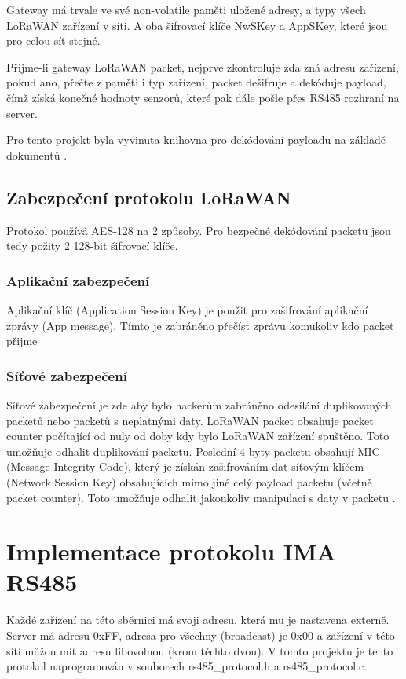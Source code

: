 Gateway má trvale ve své non-volatile paměti uložené adresy, a typy všech LoRaWAN zařízení v síti. A oba šifrovací klíče NwSKey a AppSKey, které jsou pro celou síť stejné.

Přijme-li gateway LoRaWAN packet, nejprve zkontroluje zda zná adresu zařízení, pokud ano, přečte z paměti i typ zařízení, packet dešifruje a dekóduje payload, čímž získá konečné hodnoty senzorů, které pak dále pošle přes RS485 rozhraní na server.

Pro tento projekt byla vyvinuta knihovna pro dekódování payloadu na základě dokumentů \cite{lwSpec} \cite{lwSecur}.

\subsection{Zabezpečení protokolu LoRaWAN}
Protokol používá AES-128 na 2 způsoby. Pro bezpečné dekódování packetu jsou tedy požity 2 128-bit šifrovací klíče.

\subsubsection{Aplikační zabezpečení}
Aplikační klíč (Application Session Key) je použit pro zašifrování aplikační zprávy (App message). Tímto je zabráněno přečíst zprávu komukoliv kdo packet přijme 


\subsubsection{Síťové zabezpečení}
Síťové zabezpečení je zde aby bylo hackerům zabráněno odesílání duplikovaných packetů nebo packetů s neplatnými daty.
LoRaWAN packet obsahuje packet counter počítající od nuly od doby kdy bylo LoRaWAN zařízení spuštěno. Toto umožňuje odhalit duplikování packetu.
Poslední 4 byty packetu obsahují MIC (Message Integrity Code), který je získán zašifrováním dat síťovým klíčem (Network Session Key) obsahujících mimo jiné celý payload packetu (včetně packet counter). Toto umožňuje odhalit jakoukoliv manipulaci s daty v packetu \cite{lwSpec} \cite{lwSecur}.



\section{Implementace protokolu IMA RS485}
Každé zařízení na této sběrnici má svoji adresu, která mu je nastavena externě. Server má adresu  0xFF, adresa pro všechny (broadcast) je 0x00 a zařízení v této sítí můžou mít adresu libovolnou (krom těchto dvou). V tomto projektu je tento protokol naprogramován v souborech rs485\_protocol.h a rs485\_protocol.c.

